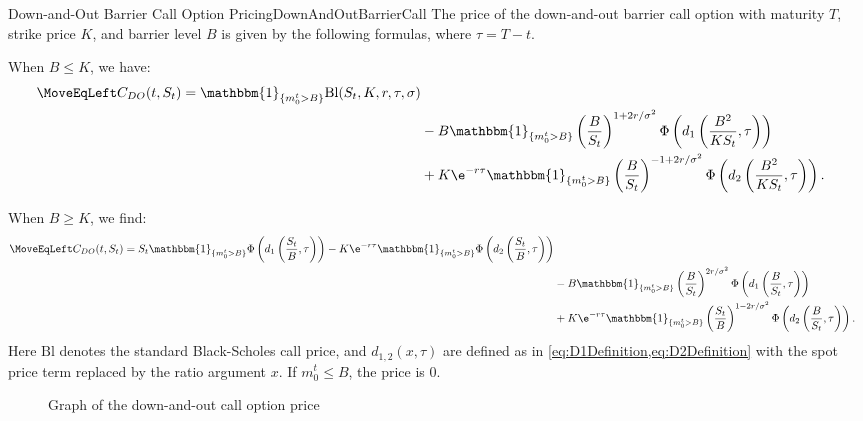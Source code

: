 \begin{prop}{Down-and-Out Barrier Call Option Pricing}{DownAndOutBarrierCall}
	The price of the down-and-out barrier call option with maturity \(T\), strike price \(K\), and barrier level \(B\) is given by the following formulas, where \(\tau = T-t\).

	When \(B \le K\), we have:
	\begin{align}
		\MoveEqLeft C_{DO}(t, S_t) = \mathbbm{1}_{\{m_0^t > B\}} \mathrm{Bl}(S_t, K, r, \tau, \sigma) \nonumber                                                      \\
		 & - B \mathbbm{1}_{\{m_0^t > B\}} \left( \frac{B}{S_t} \right)^{1+2r/\sigma^2} \Phi \left( d_1 \left( \frac{B^2}{K S_t}, \tau \right) \right) \nonumber     \\
		 & + K \e^{-r\tau} \mathbbm{1}_{\{m_0^t > B\}} \left( \frac{B}{S_t} \right)^{-1+2r/\sigma^2} \Phi \left( d_2 \left( \frac{B^2}{K S_t}, \tau \right) \right).
	\end{align}

	When \(B \ge K\), we find:
	\begin{align}
		\MoveEqLeft C_{DO}(t, S_t) = S_t \mathbbm{1}_{\{m_0^t > B\}} \Phi \left( d_1 \left( \frac{S_t}{B}, \tau \right) \right) - K \e^{-r\tau} \mathbbm{1}_{\{m_0^t > B\}} \Phi \left( d_2 \left( \frac{S_t}{B}, \tau \right) \right) \nonumber \\
		 & - B \mathbbm{1}_{\{m_0^t > B\}} \left( \frac{B}{S_t} \right)^{2r/\sigma^2} \Phi \left( d_1 \left( \frac{B}{S_t}, \tau \right) \right) \nonumber                                                                                       \\
		 & + K \e^{-r\tau} \mathbbm{1}_{\{m_0^t > B\}} \left( \frac{S_t}{B} \right)^{1-2r/\sigma^2} \Phi \left( d_2 \left( \frac{B}{S_t}, \tau \right) \right).
	\end{align}
	Here \(\mathrm{Bl}\) denotes the standard Black-Scholes call price, and \(d_{1,2}(x, \tau)\) are defined as in \cref{eq:D1Definition,eq:D2Definition} with the spot price term replaced by the ratio argument \(x\). If \(m_0^t \le B\), the price is \(0\).
\end{prop}


\begin{figure}[H]
	\centering
	
	\caption{Graph of the down-and-out call option price}
	\label{fig:downAndOutCallBarrierSurface}
\end{figure}

\clearpage
